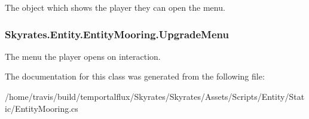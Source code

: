 The object which shows the player they can open the menu. 

\hypertarget{class_skyrates_1_1_entity_1_1_entity_mooring_afea86c223b57c927c31d9b16201841fc}{
\subsubsection[{Upgrade\-Menu}]{ Skyrates.\-Entity.\-Entity\-Mooring.\-Upgrade\-Menu}}\label{class_skyrates_1_1_entity_1_1_entity_mooring_afea86c223b57c927c31d9b16201841fc}


The menu the player opens on interaction. 



The documentation for this class was generated from the following file\-:\begin{DoxyCompactItemize}
\item 
/home/travis/build/temportalflux/\-Skyrates/\-Skyrates/\-Assets/\-Scripts/\-Entity/\-Static/Entity\-Mooring.\-cs\end{DoxyCompactItemize}
